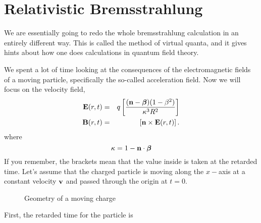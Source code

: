 \section{Relativistic Bremsstrahlung}
\label{sec:relat-bremsstr}
We are essentially going to redo the whole bremsstrahlung calculation
in an entirely different way.   This is called the method of virtual
quanta, and it gives hints about how one does calculations in
quantum field theory.

We spent a lot of time looking at the consequences of the
electromagnetic fields of a moving particle, specifically the
so-called acceleration field.    Now we will focus on the velocity
field,
\begin{eqnarray}
{\bf E}(r,t) &=& q \left [ \frac{({\bf n} - \mbox{\boldmath $\beta$})(1-\beta^2)}{\kappa^3 R^2} \right ] \\
{\bf B}(r,t) &=& \left [ {\bf n} \times {\bf E}(r,t) \right ].
\label{eq:347}
\end{eqnarray}
where
\begin{equation}
\kappa = 1 - {\bf n} \cdot \mbox{\boldmath $\beta$}
\label{eq:348}
\end{equation}
If you remember, the brackets mean that the value inside is taken at
the retarded time.  Let's assume that the charged particle is moving
along the $x-$axis at a constant velocity ${\bf v}$ and passed through
the origin at $t=0$.
{
\begin{figure}
\centering 
{}
\caption{Geometry of a moving charge}
\end{figure}
}
First, the retarded time for the particle is
